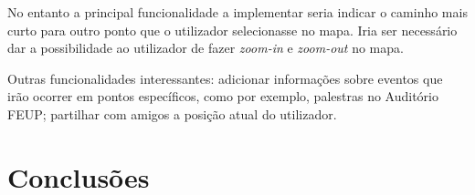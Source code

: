 \documentclass[twocolumn,twoside,11pt]{article}
\begin{document}
  No entanto a principal funcionalidade a implementar seria indicar o caminho mais curto para outro ponto que o utilizador selecionasse no mapa.
  Iria ser necessário dar a possibilidade ao utilizador de fazer \emph{zoom-in} e \emph{zoom-out} no mapa.

  Outras funcionalidades interessantes: adicionar informações sobre eventos que irão ocorrer em pontos específicos, como por exemplo, palestras no Auditório FEUP; partilhar com amigos a posição atual do utilizador.



\section{Conclusões}\label{sec:conclusions}

\lipsum[8]


\renewcommand{\bibname}{Referências}



\end{document}
